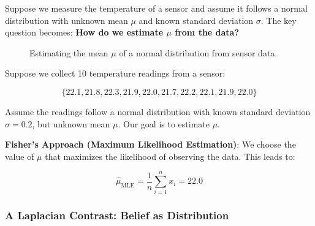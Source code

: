 \medskip

Suppose we measure the temperature of a sensor and assume it follows a normal distribution with unknown mean \( \mu \) and known standard deviation \( \sigma \). The key question becomes:  
\textbf{How do we estimate \( \mu \) from the data?}

\begin{figure}[H]
\centering
{}
\caption{Estimating the mean \( \mu \) of a normal distribution from sensor data.}
\end{figure}

\begin{example}
Suppose we collect 10 temperature readings from a sensor:

\[
\{22.1, 21.8, 22.3, 21.9, 22.0, 21.7, 22.2, 22.1, 21.9, 22.0\}
\]

Assume the readings follow a normal distribution with known standard deviation \( \sigma = 0.2 \), but unknown mean \( \mu \). Our goal is to estimate \( \mu \).

\textbf{Fisher's Approach (Maximum Likelihood Estimation)}:  
We choose the value of \( \mu \) that maximizes the likelihood of observing the data. This leads to:

\[
\hat{\mu}_{\text{MLE}} = \frac{1}{n} \sum_{i=1}^{n} x_i = 22.0
\]
\end{example}

\subsubsection{A Laplacian Contrast: Belief as Distribution}

